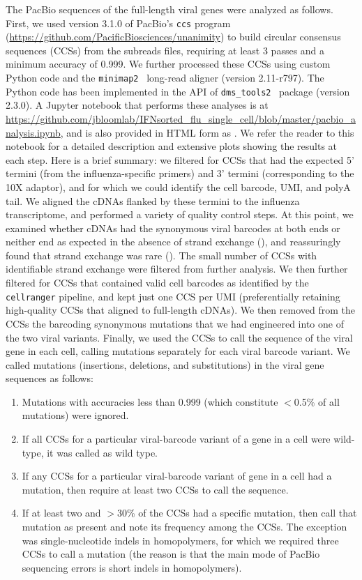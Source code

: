 \documentclass[9pt,lineno]{template}
\begin{document}
The PacBio sequences of the full-length viral genes were analyzed as follows.
First, we used version 3.1.0 of PacBio's \texttt{ccs} program (\url{https://github.com/PacificBiosciences/unanimity}) to build circular consensus sequences (CCSs) from the subreads files, requiring at least 3 passes and a minimum accuracy of 0.999.
We further processed these CCSs using custom Python code and the \texttt{minimap2}~\citep{li2018minimap2} long-read aligner (version 2.11-r797).
The Python code has been implemented in the API of \texttt{dms\_tools2}~\citep[][\url{https://jbloomlab.github.io/dms_tools2/}]{bloom2015software} package (version 2.3.0).
A Jupyter notebook that performs these analyses is at \url{https://github.com/jbloomlab/IFNsorted_flu_single_cell/blob/master/pacbio_analysis.ipynb}, and is also provided in HTML form as .
We refer the reader to this notebook for a detailed description and extensive plots showing the results at each step.
Here is a brief summary: we filtered for CCSs that had the expected 5' termini (from the influenza-specific primers) and 3' termini (corresponding to the 10X adaptor), and for which we could identify the cell barcode, UMI, and polyA tail.
We aligned the cDNAs flanked by these termini to the influenza transcriptome, and performed a variety of quality control steps.
At this point, we examined whether cDNAs had the synonymous viral barcodes at both ends or neither end as expected in the absence of strand exchange (), and reassuringly found that strand exchange was rare ().
The small number of CCSs with identifiable strand exchange were filtered from further analysis.
We then further filtered for CCSs that contained valid cell barcodes as identified by the \texttt{cellranger} pipeline, and kept just one CCS per UMI (preferentially retaining high-quality CCSs that aligned to full-length cDNAs).
We then removed from the CCSs the barcoding synonymous mutations that we had engineered into one of the two viral variants.
Finally, we used the CCSs to call the sequence of the viral gene in each cell, calling mutations separately for each viral barcode variant.
We called mutations (insertions, deletions, and substitutions) in the viral gene sequences as follows:
\begin{enumerate}
\item Mutations with accuracies less than 0.999 (which constitute $<$0.5\% of all mutations) were ignored.
\item If all CCSs for a particular viral-barcode variant of a gene in a cell were wild-type, it was called as wild type.
\item If any CCSs for a particular viral-barcode variant of gene in a cell had a mutation, then require at least two CCSs to call the sequence.
\item If at least two and $>$30\% of the CCSs had a specific mutation, then call that mutation as present and note its frequency among the CCSs. The exception was single-nucleotide indels in homopolymers, for which we required three CCSs to call a mutation (the reason is that the main mode of PacBio sequencing errors is short indels in homopolymers).
\end{enumerate}
\end{document}

